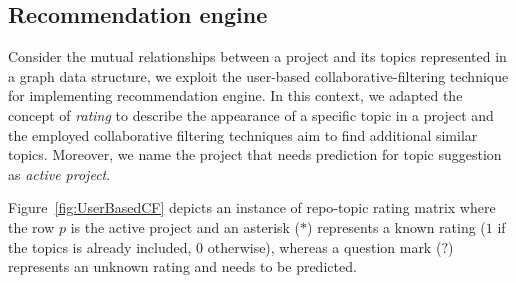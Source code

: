 

\subsection{Recommendation engine}
Consider the mutual relationships between a project and its topics represented in a graph data structure, we exploit the user-based collaborative-filtering technique for implementing \TF recommendation engine. 
In this context, we adapted the concept of \emph{rating} to describe the appearance of a specific topic in a project and the employed collaborative filtering techniques aim to find additional similar topics. Moreover, we name the project that needs prediction for topic suggestion as \emph{active project}. 

Figure~\ref{fig:UserBasedCF} depicts an instance of repo-topic rating matrix where the row $p$ is the active project and an asterisk ($*$) represents a known rating (\ie $1$ if the topics is already included, $0$ otherwise), whereas a question mark ($?$) represents an unknown rating and needs to be predicted.

